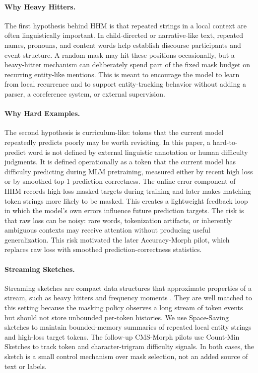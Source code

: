 \paragraph{Why Heavy Hitters.}
The first hypothesis behind HHM is that repeated strings in a local context are often linguistically important. In child-directed or narrative-like text, repeated names, pronouns, and content words help establish discourse participants and event structure. A random mask may hit these positions occasionally, but a heavy-hitter mechanism can deliberately spend part of the fixed mask budget on recurring entity-like mentions. This is meant to encourage the model to learn from local recurrence and to support entity-tracking behavior without adding a parser, a coreference system, or external supervision.

\paragraph{Why Hard Examples.}
The second hypothesis is curriculum-like: tokens that the current model repeatedly predicts poorly may be worth revisiting. In this paper, a hard-to-predict word is not defined by external linguistic annotation or human difficulty judgments. It is defined operationally as a token that the current model has difficulty predicting during MLM pretraining, measured either by recent high loss or by smoothed top-1 prediction correctness. The online error component of HHM records high-loss masked targets during training and later makes matching token strings more likely to be masked. This creates a lightweight feedback loop in which the model's own errors influence future prediction targets. The risk is that raw loss can be noisy: rare words, tokenization artifacts, or inherently ambiguous contexts may receive attention without producing useful generalization. This risk motivated the later Accuracy-Morph pilot, which replaces raw loss with smoothed prediction-correctness statistics.

\paragraph{Streaming Sketches.}
Streaming sketches are compact data structures that approximate properties of a stream, such as heavy hitters and frequency moments \citep{cormode2005improved,metwally2005spacesaving}. They are well matched to this setting because the masking policy observes a long stream of token events but should not store unbounded per-token histories. We use Space-Saving sketches to maintain bounded-memory summaries of repeated local entity strings and high-loss target tokens. The follow-up CMS-Morph pilots use Count-Min Sketches to track token and character-trigram difficulty signals. In both cases, the sketch is a small control mechanism over mask selection, not an added source of text or labels.

